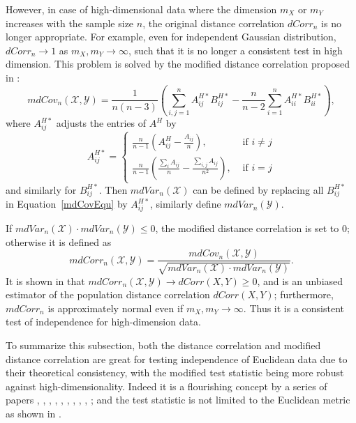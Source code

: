 \documentclass[12pt]{article}
\begin{document}
However, in case of high-dimensional data where the dimension $m_{X}$ or $m_{Y}$ increases with the sample size $n$, the original distance correlation $dCorr_{n}$ is no longer appropriate. For example, even for independent Gaussian distribution, $dCorr_{n} \rightarrow 1$ as $m_{X}, m_{Y} \rightarrow \infty$, such that it is no longer a consistent test in high dimension. This problem is solved by the modified distance correlation proposed in \cite{SzekelyRizzo2013a}:
\begin{equation}
\label{mdCovEqu}
mdCov_{n}(\mathcal{X},\mathcal{Y})=\frac{1}{n(n-3)}(\sum_{i,j=1}^{n}A^{H*}_{ij}B^{H*}_{ij}-\frac{n}{n-2}\sum_{i=1}^{n}A^{H*}_{ii}B^{H*}_{ii}),
\end{equation}
where $A^{H*}_{ij}$ adjusts the entries of $A^{H}$ by
\[A^{H*}_{ij} = \left\{
  \begin{array}{lr}
    \frac{n}{n-1}(A^{H}_{ij}-\frac{A_{ij}}{n}), & \mbox{ if } i \neq j \\
    \frac{n}{n-1}(\frac{\sum_{i}A_{ij}}{n}-\frac{\sum_{i,j}A_{ij}}{n^2}), &\mbox{ if } i = j
  \end{array}
\right.
\] and similarly for $B^{H*}_{ij}$. Then $mdVar_{n}(\mathcal{X})$ can be defined by replacing all $B^{H*}_{ij}$ in Equation~\ref{mdCovEqu} by $A^{H*}_{ij}$, similarly define $mdVar_{n}(\mathcal{Y})$. 

If $mdVar_{n}(\mathcal{X}) \cdot mdVar_{n}(\mathcal{Y}) \leq 0$, the modified distance correlation is set to $0$; otherwise it is defined as
\begin{equation}
\label{mdCorrEqu}
mdCorr_{n}(\mathcal{X},\mathcal{Y})=\frac{mdCov_{n}(\mathcal{X},\mathcal{Y})}{\sqrt{mdVar_{n}(\mathcal{X}) \cdot mdVar_{n}(\mathcal{Y})}}.
\end{equation}
It is shown in \cite{SzekelyRizzo2013a} that $mdCorr_{n}(\mathcal{X},\mathcal{Y}) \rightarrow dCorr(X,Y) \geq 0$, and is an unbiased estimator of the population distance correlation $dCorr(X,Y)$; furthermore, $mdCorr_{n}$ is approximately normal even if $m_{X},m_{Y} \rightarrow \infty$. Thus it is a consistent test of independence for high-dimension data.

To summarize this subsection, both the distance correlation and modified distance correlation are great for testing independence of Euclidean data due to their theoretical consistency, with the modified test statistic being more robust against high-dimensionality. Indeed it is a flourishing concept by a series of papers \cite{BakirovRizzoSzekely2006}, \cite{SzekelyRizzoBakirov2007}, \cite{SzekelyRizzo2009}, \cite{BickelXu2009}, \cite{Kosorok2009}, \cite{Remillard2009}, \cite{LiZhongZhu2012}, \cite{SzekelyRizzo2013a}, \cite{SzekelyRizzo2013b}, \cite{SzekelyRizzo2014}; and the test statistic is not limited to the Euclidean metric as shown in \cite{Lyons2013}. 
\end{document}
